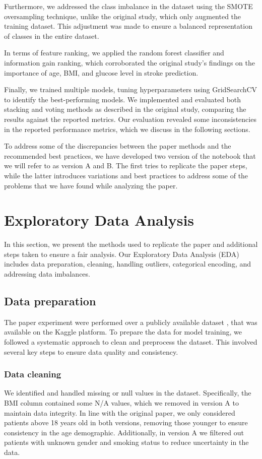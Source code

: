 \documentclass[twocolumn, 9pt]{extarticle}
\begin{document}
Furthermore, we addressed the class imbalance in the dataset using the SMOTE oversampling technique, unlike the original study, which only augmented the training dataset. This adjustment was made to ensure a balanced representation of classes in the entire dataset.

In terms of feature ranking, we applied the random forest classifier and information gain ranking, which corroborated the original study's findings on the importance of age, BMI, and glucose level in stroke prediction.

Finally, we trained multiple models, tuning hyperparameters using GridSearchCV to identify the best-performing models. We implemented and evaluated both stacking and voting methods as described in the original study, comparing the results against the reported metrics. Our evaluation revealed some inconsistencies in the reported performance metrics, which we discuss in the following sections.

To address some of the discrepancies between the paper methods and the recommended best practices, we have developed two version of the notebook that we will refer to as version A and B. The first tries to replicate the paper steps, while the latter introduces variations and best practices to address some of the problems that we have found while analyzing the paper.

\section{Exploratory Data Analysis}
In this section, we present the methods used to replicate the paper and additional steps taken to ensure a fair analysis. Our Exploratory Data Analysis (EDA) includes data preparation, cleaning, handling outliers, categorical encoding, and addressing data imbalances.

\subsection{Data preparation}
The paper experiment were performed over a publicly available dataset \cite{dataset}, that was available on the Kaggle platform.
To prepare the data for model training, we followed a systematic approach to clean and preprocess the dataset. This involved several key steps to ensure data quality and consistency.

\subsubsection{Data cleaning}
We identified and handled missing or null values in the dataset. Specifically, the BMI column contained some N/A values, which we removed in version A to maintain data integrity. In line with the original paper, we only considered patients above 18 years old in both versions, removing those younger to ensure consistency in the age demographic. Additionally, in version A we filtered out patients with unknown gender and smoking status to reduce uncertainty in the data.
\end{document}
